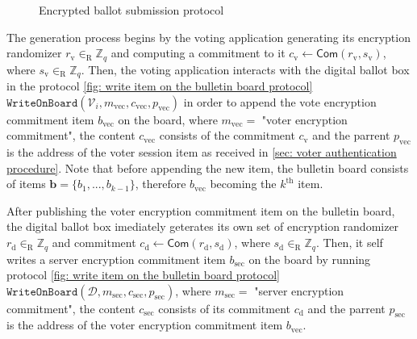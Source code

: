 \begin{figure}[ht]
    \caption{Encrypted ballot submission protocol}
    \label{fig: encrypted ballot submission protocol}
\end{figure}

The generation process begins by the voting application generating its encryption randomizer $r_\mathrm{v} \in_\mathrm{R} \mathbb{Z}_q$ and computing a commitment to it $c_\mathrm{v} \gets \mathsf{Com}(r_\mathrm{v}, s_\mathrm{v})$, where $s_\mathrm{v} \in_\mathrm{R} \mathbb{Z}_q$. Then, the voting application interacts with the digital ballot box in the protocol \ref{fig: write item on the bulletin board protocol} $\mathtt{WriteOnBoard}(\mathcal{V}_i, m_\mathrm{vec}, c_\mathrm{vec}, p_\mathrm{vec})$ in order to append the vote encryption commitment item $b_\mathrm{vec}$ on the board, where $m_\mathrm{vec} =$ "voter encryption commitment", the content $c_\mathrm{vec}$ consists of the commitment $c_\mathrm{v}$ and the parrent $p_\mathrm{vec}$ is the address of the voter session item as received in \cref{sec: voter authentication procedure}. Note that before appending the new item, the bulletin board consists of items $\boldsymbol{b} = \{ b_1, ..., b_{k-1} \}$, therefore $b_\mathrm{vec}$ becoming the $k^\mathrm{th}$ item.

After publishing the voter encryption commitment item on the bulletin board, the digital ballot box imediately geterates its own set of encryption randomizer $r_\mathrm{d} \in_\mathrm{R} \mathbb{Z}_q$ and commitment $c_\mathrm{d} \gets \mathsf{Com}(r_\mathrm{d}, s_\mathrm{d})$, where $s_\mathrm{d} \in_\mathrm{R} \mathbb{Z}_q$. Then, it self writes a server encryption commitment item $b_\mathrm{sec}$ on the board by running protocol \ref{fig: write item on the bulletin board protocol} $\mathtt{WriteOnBoard}(\mathcal{D}, m_\mathrm{sec}, c_\mathrm{sec}, p_\mathrm{sec})$, where $m_\mathrm{sec} =$ "server encryption commitment", the content $c_\mathrm{sec}$ consists of its commitment $c_\mathrm{d}$ and the parrent $p_\mathrm{sec}$ is the address of the voter encryption commitment item $b_\mathrm{vec}$.

